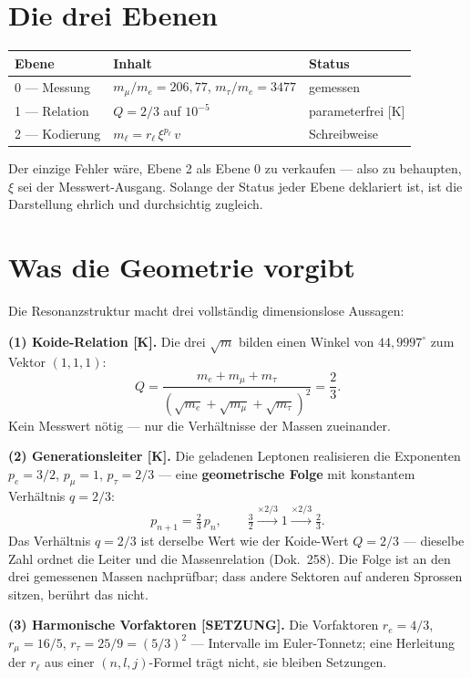 \chapter{Die drei Ebenen}

\begin{center}
\begin{tabular}{lll}
\toprule
Ebene & Inhalt & Status \\
\midrule
0 — Messung & $m_\mu/m_e = 206{,}77$, $m_\tau/m_e = 3477$ & gemessen \\
1 — Relation & $Q = 2/3$ auf $10^{-5}$ & parameterfrei [K] \\
2 — Kodierung & $m_\ell = r_\ell\,\xi^{p_\ell}\,v$ & Schreibweise \\
\bottomrule
\end{tabular}
\end{center}

Der einzige Fehler wäre, Ebene 2 als Ebene 0 zu verkaufen — also zu
behaupten, $\xi$ sei der Messwert-Ausgang. Solange der Status jeder
Ebene deklariert ist, ist die Darstellung ehrlich und durchsichtig
zugleich.

\chapter{Was die Geometrie vorgibt}

Die Resonanzstruktur macht drei vollständig dimensionslose Aussagen:

\textbf{(1) Koide-Relation [K].} Die drei $\sqrt m$ bilden einen Winkel
von $44{,}9997^\circ$ zum Vektor $(1,1,1)$:
\[
  Q = \frac{m_e + m_\mu + m_\tau}
           {(\sqrt{m_e}+\sqrt{m_\mu}+\sqrt{m_\tau})^2} = \frac{2}{3}.
\]
Kein Messwert nötig — nur die Verhältnisse der Massen zueinander.

\textbf{(2) Generationsleiter [K].} Die geladenen Leptonen realisieren
die Exponenten $p_e = 3/2$, $p_\mu = 1$, $p_\tau = 2/3$ — eine
\textbf{geometrische Folge} mit konstantem Verhältnis
$q = 2/3$:
\[
  p_{n+1} = \tfrac{2}{3}\,p_n, \qquad
  \tfrac{3}{2} \xrightarrow{\times 2/3} 1 \xrightarrow{\times 2/3} \tfrac{2}{3}.
\]
Das Verhältnis $q = 2/3$ ist derselbe Wert wie der Koide-Wert
$Q = 2/3$ — dieselbe Zahl ordnet die Leiter und die Massenrelation
(Dok.~258). Die Folge ist an den drei gemessenen Massen nachprüfbar;
dass andere Sektoren auf anderen Sprossen sitzen, berührt das nicht.

\textbf{(3) Harmonische Vorfaktoren [SETZUNG].} Die Vorfaktoren
$r_e = 4/3$, $r_\mu = 16/5$, $r_\tau = 25/9 = (5/3)^2$ — Intervalle im
Euler-Tonnetz; eine Herleitung der $r_\ell$ aus einer $(n,l,j)$-Formel
trägt nicht, sie bleiben Setzungen.

